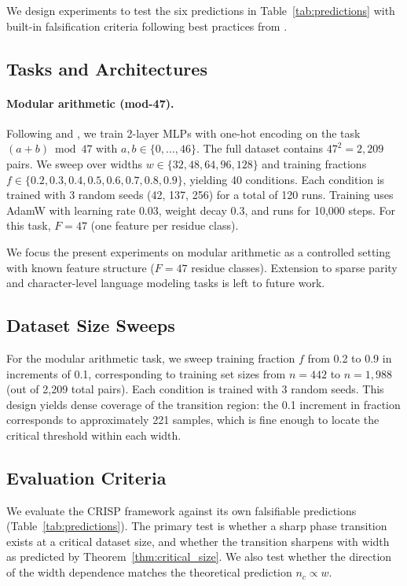 \documentclass{article}
\newcommand{\nc}{n_c}
\newcommand{\Fnum}{F}
\begin{document}
We design experiments to test the six predictions in Table~\ref{tab:predictions} with built-in falsification criteria following best practices from \citet{schaeffer2024emergent}.

\subsection{Tasks and Architectures}

\paragraph{Modular arithmetic (mod-47).}
Following \citet{power2022grokking} and \citet{nanda2023progress}, we train 2-layer MLPs with one-hot encoding on the task $(a + b) \bmod 47$ with $a, b \in \{0, \ldots, 46\}$.
The full dataset contains $47^2 = 2{,}209$ pairs.
We sweep over widths $w \in \{32, 48, 64, 96, 128\}$ and training fractions $f \in \{0.2, 0.3, 0.4, 0.5, 0.6, 0.7, 0.8, 0.9\}$, yielding 40 conditions.
Each condition is trained with 3 random seeds (42, 137, 256) for a total of 120 runs.
Training uses AdamW with learning rate $0.03$, weight decay $0.3$, and runs for 10{,}000 steps.
For this task, $\Fnum = 47$ (one feature per residue class).

We focus the present experiments on modular arithmetic as a controlled setting with known feature structure ($\Fnum = 47$ residue classes).
Extension to sparse parity and character-level language modeling tasks is left to future work.

\subsection{Dataset Size Sweeps}

For the modular arithmetic task, we sweep training fraction $f$ from 0.2 to 0.9 in increments of 0.1, corresponding to training set sizes from $n = 442$ to $n = 1{,}988$ (out of 2{,}209 total pairs).
Each condition is trained with 3 random seeds.
This design yields dense coverage of the transition region: the 0.1 increment in fraction corresponds to approximately 221 samples, which is fine enough to locate the critical threshold within each width.

\subsection{Evaluation Criteria}

We evaluate the CRISP framework against its own falsifiable predictions (Table~\ref{tab:predictions}).
The primary test is whether a sharp phase transition exists at a critical dataset size, and whether the transition sharpens with width as predicted by Theorem~\ref{thm:critical_size}.
We also test whether the direction of the width dependence matches the theoretical prediction $\nc \propto w$.
\end{document}
